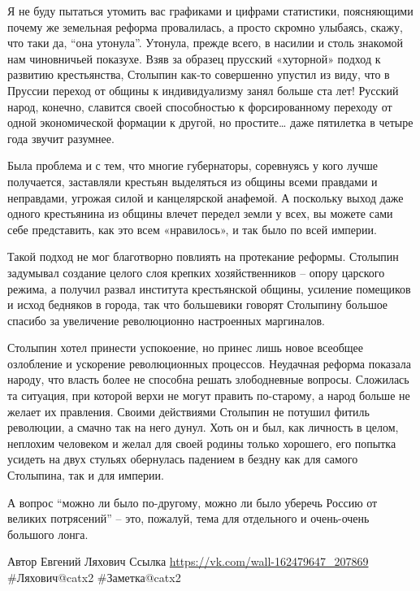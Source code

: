 Я не буду пытаться утомить вас графиками и цифрами статистики, поясняющими почему же земельная реформа провалилась, а просто скромно улыбаясь, скажу, что таки да, “она утонула”. Утонула, прежде всего, в насилии и столь знакомой нам чиновничьей показухе. Взяв за образец прусский «хуторной» подход к развитию крестьянства, Столыпин как-то совершенно упустил из виду, что в Пруссии переход от общины к индивидуализму занял больше ста лет! Русский народ, конечно, славится своей способностью к форсированному переходу от одной экономической формации к другой, но простите… даже пятилетка в четыре года звучит разумнее.

Была проблема и с тем, что многие губернаторы, соревнуясь у кого лучше получается, заставляли крестьян выделяться из общины всеми правдами и неправдами, угрожая силой и канцелярской анафемой. А поскольку выход даже одного крестьянина из общины влечет передел земли у всех, вы можете сами себе представить, как это всем «нравилось», и так было по всей империи.

Такой подход не мог благотворно повлиять на протекание реформы. Столыпин задумывал создание целого слоя крепких хозяйственников – опору царского режима, а получил развал института крестьянской общины, усиление помещиков и исход бедняков в города, так что большевики говорят Столыпину большое спасибо за увеличение революционно настроенных маргиналов.

Столыпин хотел принести успокоение, но принес лишь новое всеобщее озлобление и ускорение революционных процессов. Неудачная реформа показала народу, что власть более не способна решать злободневные вопросы. Сложилась та ситуация, при которой верхи не могут править по-старому, а народ больше не желает их правления. Своими действиями Столыпин не потушил фитиль революции, а смачно так на него дунул. Хоть он и был, как личность в целом, неплохим человеком и желал для своей родины только хорошего, его попытка усидеть на двух стульях обернулась падением в бездну как для самого Столыпина, так и для империи.

А вопрос “можно ли было по-другому, можно ли было уберечь Россию от великих потрясений” – это, пожалуй, тема для отдельного и очень-очень большого лонга.

Автор Евгений Ляхович Ссылка \url{https://vk.com/wall-162479647_207869}
\#Ляхович@catx2
\#Заметка@catx2

